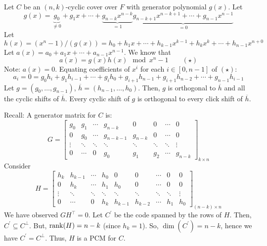 Let $ C $ be an $ (n,k) $-cyclic cover over $ F $ with generator
polynomial $ g(x) $. Let
\[ g(x)=\underbrace{g_0}_{\neq 0}+g_1x+\cdots+\underbrace{g_{n-k}x^{n-k}}_{=1}
    \underbrace{g_{n-k+1}x^{n-k+1}+\cdots+g_{n-1}x^{n-1}}_{=0} \]
Let
\[ h(x)=(x^n-1)/(g(x))=h_0+h_1x+\cdots+h_{k-1}x^{k-1}+h_k x^k+\cdots+h_{n-1}x^{n+0} \]
Let $ a(x)=a_0+a_1x+\cdots+a_{n-1}x^{n-1} $. We know that
\[ a(x)=g(x)h(x)\mod x^n-1 \qquad (\star) \]
Note: $ a(x)=0 $. Equating coefficients of $ x^i $ for each $ i\in [0,n-1] $
of $ (\star) $:
\[ a_i=0=g_0h_i+g_1h_{i-1}+\cdots+g_i h_0+g_{i+1}h_{n-1}
    +g_{i+1}h_{n-2}+\cdots+g_{n-1}h_{i-1} \]
Let $ g=(g_0,\ldots ,g_{n-1}) $, $ \overline{h}=(h_{n-1},\ldots ,h_0) $.
Then, $ g $ is orthogonal to $ \overline{h} $ and all the cyclic shifts
of $ \overline{h} $. Every cyclic shift of $ g $ is orthogonal to
every click shift of $ \overline{h} $.

Recall: A generator matrix for $ C $ is:
\[ G=
    \left[
        \begin{array}{cccccccc}
            g_{0}  & g_{1}  & \cdots & g_{n-k}   & 0       & 0      & \cdots & 0       \\
            0      & g_{0}  & \cdots & g_{n-k-1} & g_{n-k} & 0      & \cdots & 0       \\
            \vdots & \ddots & \ddots & \ddots    & \ddots  & \ddots & \ddots & \vdots  \\
            0      & \cdots & 0      & g_{0}     & g_{1}   & g_{2}  & \cdots & g_{n-k}
        \end{array}
        \right]_{k \times{} n} \]
Consider
\[ H=
    \left[
        \begin{array}{ccccccccc}
            h_{k}  & h_{k-1} & \cdots & h_{0}  & 0       & 0       & \cdots & 0      & 0      \\
            0      & h_{k}   & \cdots & h_{1}  & h_{0}   & 0       & \cdots & 0      & 0      \\
            \vdots & \ddots  & \ddots & \ddots & \ddots  & \ddots  & \ddots & \ddots & \vdots \\
            0      & \cdots  & 0      & h_{k}  & h_{k-1} & h_{k-2} & \cdots & h_{1}  & h_{0}
        \end{array}
        \right]_{(n-k) \times{} n} \]
We have observed $ GH^{\top}=0 $. Let $ C^{\prime} $ be the code
spanned by the rows of $ H $. Then, $ C^{\prime}\subseteq C^{\perp} $.
But, $ \operatorname{rank}(H)=n-k $ (since $ h_k=1 $). So, $ \dim(C^\prime)=n-k $,
hence we have $ C^\prime=C^{\perp} $. Thus, $ H $ is a PCM for $ C $.

